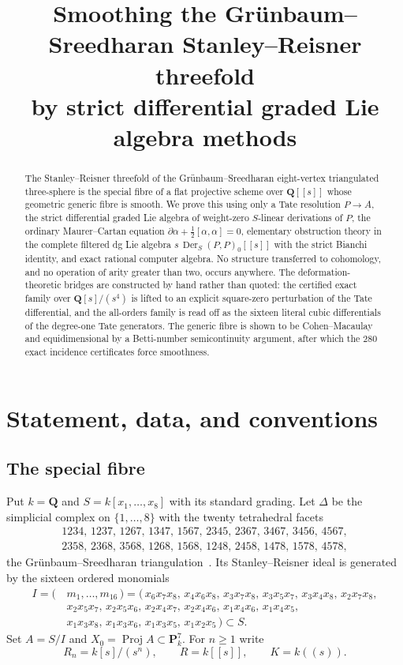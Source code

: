 \documentclass[11pt]{article}
\title{Smoothing the Gr\"unbaum--Sreedharan Stanley--Reisner threefold\\
by strict differential graded Lie algebra methods}
\author{}
\date{}
\theoremstyle{definition}
\theoremstyle{remark}
\newcommand{\QQ}{\mathbf Q}
\newcommand{\PP}{\mathbf P}
\newcommand{\Proj}{\operatorname{Proj}}
\newcommand{\Der}{\operatorname{Der}}
\begin{document}
\maketitle

\begin{abstract}
The Stanley--Reisner threefold of the Gr\"unbaum--Sreedharan eight-vertex
triangulated three-sphere is the special fibre of a flat projective scheme
over $\QQ[[s]]$ whose geometric generic fibre is smooth.  We prove this using
only a Tate resolution $P\to A$, the strict differential graded Lie algebra
of weight-zero $S$-linear derivations of $P$, the ordinary Maurer--Cartan
equation $\partial\alpha+\tfrac12[\alpha,\alpha]=0$, elementary obstruction
theory in the complete filtered dg Lie algebra $s\,\Der_S(P,P)_0[[s]]$ with
the strict Bianchi identity, and exact rational computer algebra.  No
structure transferred to cohomology, and no operation of arity greater
than two, occurs anywhere.  The deformation-theoretic bridges are constructed
by hand rather than quoted: the certified exact family over $\QQ[s]/(s^4)$ is
lifted to an explicit square-zero perturbation of the Tate differential, and
the all-orders family is read off as the sixteen literal cubic differentials
of the degree-one Tate generators.  The generic fibre is shown to be
Cohen--Macaulay and equidimensional by a Betti-number semicontinuity argument,
after which the $280$ exact incidence certificates force smoothness.
\end{abstract}

\tableofcontents

\section{Statement, data, and conventions}\label{sec:statement}

\subsection{The special fibre}

Put $k=\QQ$ and $S=k[x_1,\ldots,x_8]$ with its standard grading.  Let
$\Delta$ be the simplicial complex on $\{1,\ldots,8\}$ with the twenty
tetrahedral facets
\[
\begin{gathered}
1234,\,1237,\,1267,\,1347,\,1567,\,2345,\,2367,\,3467,\,3456,\,4567,\\
2358,\,2368,\,3568,\,1268,\,1568,\,1248,\,2458,\,1478,\,1578,\,4578,
\end{gathered}
\]
the Gr\"unbaum--Sreedharan triangulation~\cite{GS}.  Its Stanley--Reisner
ideal is generated by the sixteen ordered monomials
\[
\begin{split}
I=(\,&m_1,\ldots,m_{16}\,)
=(\,x_6x_7x_8,\,x_4x_6x_8,\,x_3x_7x_8,\,x_3x_5x_7,\,
x_3x_4x_8,\,x_2x_7x_8,\\
&x_2x_5x_7,\,x_2x_5x_6,\,x_2x_4x_7,\,x_2x_4x_6,\,
x_1x_4x_6,\,x_1x_4x_5,\\
&x_1x_3x_8,\,x_1x_3x_6,\,x_1x_3x_5,\,x_1x_2x_5\,)\subset S.
\end{split}
\tag{1.1}\label{eq:ideal}
\]
Set $A=S/I$ and $X_0=\Proj A\subset\PP^7_k$.  For $n\geq1$ write
\[
 R_n=k[s]/(s^n),\qquad R=k[[s]],\qquad K=k((s)).
\]
\end{document}
